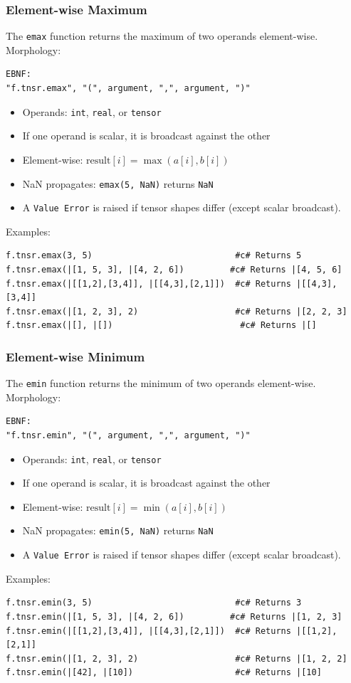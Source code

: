 \subsubsection{Element-wise Maximum}
The \texttt{emax} function returns the maximum of two operands element-wise.\\
Morphology:
\begin{verbatim}
EBNF:
"f.tnsr.emax", "(", argument, ",", argument, ")"
\end{verbatim}
\begin{itemize}
\item Operands: \texttt{int}, \texttt{real}, or \texttt{tensor}
\item If one operand is scalar, it is broadcast against the other
\item Element-wise: $\text{result}[i] = \max(a[i], b[i])$
\item NaN propagates: \texttt{emax(5, NaN)} returns \texttt{NaN}
\item A \texttt{Value Error} is raised if tensor shapes differ (except scalar broadcast).
\end{itemize}
Examples:
\begin{verbatim}
f.tnsr.emax(3, 5)                            #c# Returns 5
f.tnsr.emax(|[1, 5, 3], |[4, 2, 6])         #c# Returns |[4, 5, 6]
f.tnsr.emax(|[[1,2],[3,4]], |[[4,3],[2,1]])  #c# Returns |[[4,3],[3,4]]
f.tnsr.emax(|[1, 2, 3], 2)                   #c# Returns |[2, 2, 3]
f.tnsr.emax(|[], |[])                         #c# Returns |[]
\end{verbatim}

\subsubsection{Element-wise Minimum}
The \texttt{emin} function returns the minimum of two operands element-wise.\\
Morphology:
\begin{verbatim}
EBNF:
"f.tnsr.emin", "(", argument, ",", argument, ")"
\end{verbatim}
\begin{itemize}
\item Operands: \texttt{int}, \texttt{real}, or \texttt{tensor}
\item If one operand is scalar, it is broadcast against the other
\item Element-wise: $\text{result}[i] = \min(a[i], b[i])$
\item NaN propagates: \texttt{emin(5, NaN)} returns \texttt{NaN}
\item A \texttt{Value Error} is raised if tensor shapes differ (except scalar broadcast).
\end{itemize}
Examples:
\begin{verbatim}
f.tnsr.emin(3, 5)                            #c# Returns 3
f.tnsr.emin(|[1, 5, 3], |[4, 2, 6])         #c# Returns |[1, 2, 3]
f.tnsr.emin(|[[1,2],[3,4]], |[[4,3],[2,1]])  #c# Returns |[[1,2],[2,1]]
f.tnsr.emin(|[1, 2, 3], 2)                   #c# Returns |[1, 2, 2]
f.tnsr.emin(|[42], |[10])                    #c# Returns |[10]
\end{verbatim}

